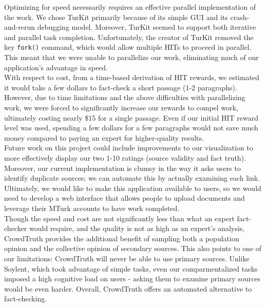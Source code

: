 \documentclass[10pt]{article}
\begin{document}
\noindent
Optimizing for speed necessarily requires an effective parallel implementation of the work. We chose TurKit primarily because of its simple GUI and its crash-and-rerun debugging model. Moreover, TurKit seemed to support both iterative and parallel task completion. Unfortunately, the creator of TurKit removed the key \verb!fork()! command, which would allow multiple HITs to proceed in parallel. This meant that we were unable to parallelize our work, eliminating much of our application's advantage in speed. \\

\noindent
With respect to cost, from a time-based derivation of HIT rewards, we estimated it would take a few dollars to fact-check a short passage (1-2 paragraphs). However, due to time limitations and the above difficulties with parallelizing work, we were forced to significantly increase our rewards to compel work, ultimately costing nearly \$15 for a single passage. Even if our initial HIT reward level was used, spending a few dollars for a few paragraphs would not save much money compared to paying an expert for higher-quality results. \\

\noindent
Future work on this project could include improvements to our visualization to more effectively display our two 1-10 ratings (source validity and fact truth). Moreover, our current implementation is clumsy in the way it asks users to identify duplicate sources; we can automate this by actually examining each link. Ultimately, we would like to make this application available to users, so we would need to develop a web interface that allows people to upload documents and leverage their MTurk accounts to have work completed. \\

\noindent
Though the speed and cost are not significantly less than what an expert fact-checker would require, and the quality is not as high as an expert's analysis, CrowdTruth provides the additional benefit of sampling both a population opinion and the collective opinion of secondary sources. This also points to one of our limitations: CrowdTruth will never be able to use primary sources. Unlike Soylent, which took advantage of simple tasks, even our comparmentalized tasks imposed a high cognitive load on users - asking them to examine primary sources would be even harder. Overall, CrowdTruth offers an automated alternative to fact-checking.
\end{document}
